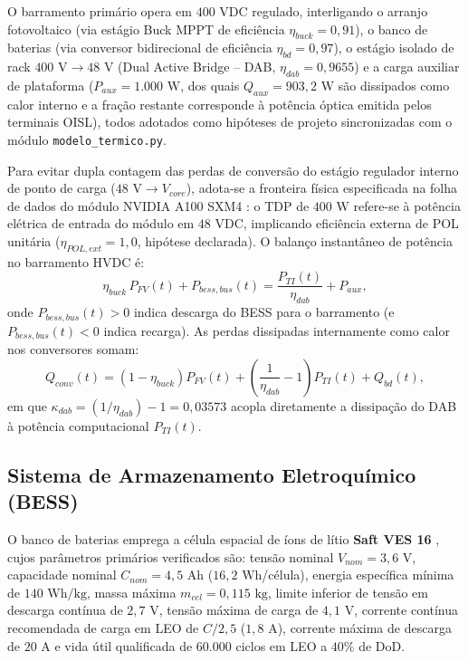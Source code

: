 O barramento primário opera em $400\text{ VDC}$ regulado, interligando o arranjo fotovoltaico (via estágio Buck MPPT de eficiência $\eta_{buck} = 0{,}91$), o banco de baterias (via conversor bidirecional de eficiência $\eta_{bd} = 0{,}97$), o estágio isolado de rack $400\text{ V} \to 48\text{ V}$ (Dual Active Bridge -- DAB, $\eta_{dab} = 0{,}9655$) e a carga auxiliar de plataforma ($P_{aux} = 1.000\text{ W}$, dos quais $Q_{aux} = 903{,}2\text{ W}$ são dissipados como calor interno e a fração restante corresponde à potência óptica emitida pelos terminais OISL), todos adotados como hipóteses de projeto sincronizadas com o módulo \texttt{modelo\_termico.py}.

Para evitar dupla contagem das perdas de conversão do estágio regulador interno de ponto de carga ($48\text{ V} \to V_{core}$), adota-se a fronteira física especificada na folha de dados do módulo NVIDIA A100 SXM4 \cite{nvidia_a100_datasheet}: o TDP de $400\text{ W}$ refere-se à potência elétrica de entrada do módulo em $48\text{ VDC}$, implicando eficiência externa de POL unitária ($\eta_{POL,ext} = 1{,}0$, hipótese declarada). O balanço instantâneo de potência no barramento HVDC é:
\begin{equation}
    \eta_{buck}\, P_{FV}(t) + P_{bess,bus}(t) = \frac{P_{TI}(t)}{\eta_{dab}} + P_{aux},
    \label{eq:balanco_hvdc}
\end{equation}
onde $P_{bess,bus}(t) > 0$ indica descarga do BESS para o barramento (e $P_{bess,bus}(t) < 0$ indica recarga). As perdas dissipadas internamente como calor nos conversores somam:
\begin{equation}
    Q_{conv}(t) = (1 - \eta_{buck}) P_{FV}(t) + \left(\frac{1}{\eta_{dab}} - 1\right) P_{TI}(t) + Q_{bd}(t),
    \label{eq:perdas_conv}
\end{equation}
em que $\kappa_{dab} = (1/\eta_{dab}) - 1 = 0{,}03573$ acopla diretamente a dissipação do DAB à potência computacional $P_{TI}(t)$.

\subsection{Sistema de Armazenamento Eletroquímico (BESS)}
\label{sec:modelo_bess}

O banco de baterias emprega a célula espacial de íons de lítio \textbf{Saft VES 16} \cite{saft_ves16}, cujos parâmetros primários verificados são: tensão nominal $V_{nom} = 3{,}6\text{ V}$, capacidade nominal $C_{nom} = 4{,}5\text{ Ah}$ ($16{,}2\text{ Wh}$/célula), energia específica mínima de $140\text{ Wh/kg}$, massa máxima $m_{cel} = 0{,}115\text{ kg}$, limite inferior de tensão em descarga contínua de $2{,}7\text{ V}$, tensão máxima de carga de $4{,}1\text{ V}$, corrente contínua recomendada de carga em LEO de $C/2{,}5$ ($1{,}8\text{ A}$), corrente máxima de descarga de $20\text{ A}$ e vida útil qualificada de $60.000$ ciclos em LEO a $40\%$ de DoD.

